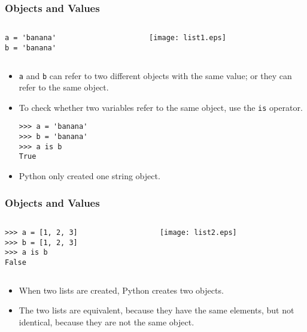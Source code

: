 \documentclass{beamer}
\newcommand{\beforeverb}{\footnotesize}
\newcommand{\afterverb}{\normalsize}
\begin{document}
\begin{frame}[fragile]
\frametitle{Objects and Values}

\begin{columns}

\begin{column}{0.4\textwidth}
\begin{block}{}
\beforeverb
\begin{verbatim}
a = 'banana'
b = 'banana'
\end{verbatim}
\afterverb
\end{block}

\end{column}
\begin{column}{0.4\textwidth}
\centerline{\texttt{[image: list1.eps]}}
\end{column}
\end{columns}

\begin{itemize}
\item {\tt a} and {\tt b} can refer to two \alert{different objects} with  the \alert{same value}; or  they can refer to the \alert{same
object}.

\item To check whether two variables refer to the same object, use the {\tt is} operator.

\beforeverb
\begin{verbatim}
>>> a = 'banana'
>>> b = 'banana'
>>> a is b
True
\end{verbatim}
\afterverb
\item Python only created \alert{ one} string object.

%
\end{itemize}
\end{frame}
\begin{frame}[fragile]
\frametitle{Objects and Values}

\begin{columns}

\begin{column}{0.4\textwidth}
\begin{block}{}
\beforeverb
\begin{verbatim}
>>> a = [1, 2, 3]
>>> b = [1, 2, 3]
>>> a is b
False
\end{verbatim}
\afterverb
\end{block}

\end{column}
\begin{column}{0.4\textwidth}
\centerline{\texttt{[image: list2.eps]}}
\end{column}
\end{columns}
%
\vspace{1cm}
\begin{itemize}
\item When two lists are created, Python creates \alert{two} objects.  
\item The two lists are \alert{ equivalent},
because they have the same elements, but not \alert{identical}, because
they are not the same object.  
\end{itemize}
\end{frame}
\end{document}
